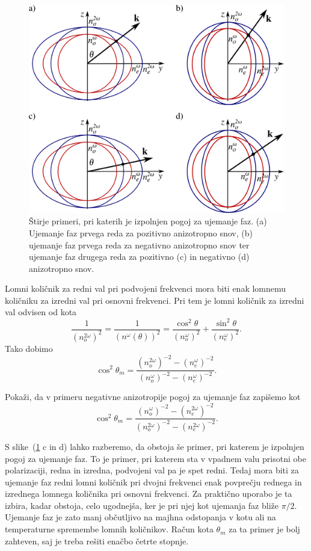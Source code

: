 \documentclass[11pt,fleqn]{book} %
\newcommand{\beq}{\begin{equation}}
\newcommand{\eeq}{\end{equation}}
\begin{document}
\begin{figure}[h]
\centering
\includegraphics[width=12truecm]{slike/08_dk.png}
\caption{Štirje primeri, pri katerih je izpolnjen pogoj za ujemanje faz. 
(a) Ujemanje faz prvega reda za pozitivno anizotropno snov, (b)
ujemanje faz prvega reda za negativno anizotropno snov ter 
ujemanje faz drugega reda za pozitivno (c) in negativno (d) anizotropno snov.}
\label{fig:dk}
\end{figure}


Lomni količnik za redni val pri podvojeni frekvenci mora biti enak lomnemu 
količniku za izredni val pri osnovni frekvenci. Pri tem je lomni količnik
za izredni val odvisen od kota
\begin{equation}
\frac{1}{(n_o^{2\omega})^2} = \frac{1}{(n^{\omega}(\theta))^2}=
\frac{\cos^{2}\theta}{(n_{o}^{\omega})^2}+\frac{\sin^{2}\theta}{(n_{e}^{\omega})^2}.
\label{8.12}
\end{equation}
Tako dobimo 
\begin{equation}
\cos^{2}\theta_m=\frac{(n_o^{2\omega})^{-2}-(n_{e}^{\omega})^{-2}}
{(n_{o}^{\omega})^{-2}-(n_{e}^{\omega})^{-2}}.
\label{8.13}
\end{equation}
\begin{definition}
Pokaži, da v primeru negativne anizotropije pogoj za ujemanje faz zapišemo kot
\beq
\cos^{2}\theta_m=\frac{(n_o^{\omega})^{-2}-(n_{e}^{2\omega})^{-2}}
{(n_{o}^{2\omega})^{-2}-(n_{e}^{2\omega})^{-2}}.
\eeq
\label{8.13a}
\end{definition}


S slike~(\ref{fig:dk} c in d) lahko razberemo, da obstoja še primer, pri 
katerem je izpolnjen pogoj za ujemanje faz. To je primer, pri katerem sta v vpadnem
valu prisotni obe polarizaciji, redna in izredna, podvojeni val pa
je spet redni. Tedaj mora biti za ujemanje faz redni lomni količnik
pri dvojni frekvenci enak povprečju rednega in izrednega lomnega količnika
pri osnovni frekvenci. Za praktično uporabo je ta izbira, kadar obstoja,
celo ugodnejša, ker je pri njej kot ujemanja faz bliže $\pi/2$. 
Ujemanje faz je zato manj občutljivo na majhna odstopanja v kotu ali na temperaturne
spremembe lomnih količnikov. Račun kota $\theta_m$ za ta primer je
bolj zahteven, saj je treba rešiti enačbo četrte stopnje.\\
\end{document}
